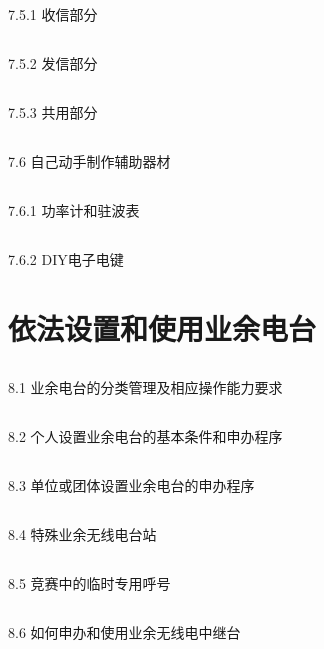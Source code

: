 \documentclass[12pt,UTF8]{ctexbook}
\begin{document}
\section{}7.5.1 收信部分
\section{}7.5.2 发信部分
\section{}7.5.3 共用部分
\section{}7.6 自己动手制作辅助器材
\section{}7.6.1 功率计和驻波表
\section{}7.6.2 DIY电子电键

\chapter{依法设置和使用业余电台}

\section{}8.1 业余电台的分类管理及相应操作能力要求
\section{}8.2 个人设置业余电台的基本条件和申办程序
\section{}8.3 单位或团体设置业余电台的申办程序
\section{}8.4 特殊业余无线电台站
\section{}8.5 竞赛中的临时专用呼号
\section{}8.6 如何申办和使用业余无线电中继台
\end{document}
